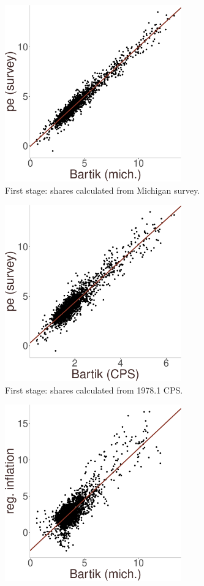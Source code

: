 \documentclass[12pt]{article}
\begin{document}
\begin{figure}
\centering
\caption{Inflation expectations and inflation: reduced-form estimates.}\label{fig:redform}
\begin{subfigure}[t]{0.475\textwidth}
\centering
\includegraphics[width = 3in, height =3in]{figs/firststage}
\caption{First stage: shares calculated from Michigan survey.  }\label{subfig:redform:stage1:michigan}
\end{subfigure}
\quad
\begin{subfigure}[t]{0.475\textwidth}
\centering
\includegraphics[width =3in, height =3in]{figs/firststage_cps}
\caption{First stage: shares calculated from 1978.1 CPS.}\label{subfig:redform:stage1:cps}
\end{subfigure}
\vfill
\begin{subfigure}[t]{0.475\textwidth}
\centering
\includegraphics[width =3in, height =3in]{figs/redform}

\end{subfigure}
\end{figure}
\end{document}

